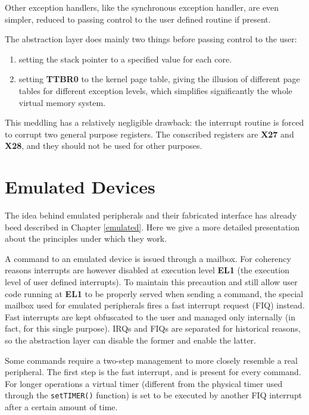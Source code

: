 \documentclass[12pt,a4paper,openright,twoside]{report}
\begin{document}
Other exception handlers, like the synchronous exception handler, are even 
simpler, reduced to passing control to the user defined routine if present.

The abstraction layer does mainly two things before passing control to the user:
\begin{enumerate}
    \item setting the stack pointer to a specified value for each core.
    \item setting \textbf{TTBR0} to the kernel page table, giving the illusion
        of different page tables for different exception levels, which simplifies
        significantly the whole virtual memory system.
\end{enumerate}
This meddling has a relatively negligible drawback: the interrupt routine is forced
to corrupt two general purpose registers.
 The conscribed registers are \textbf{X27}
and \textbf{X28}, and they should not be used for other purposes.

\section{Emulated Devices}
\label{emulateddev}
The idea behind emulated peripherals and their fabricated interface 
has already beed described in Chapter \ref{emulated}. Here we give a more detailed 
presentation about the principles under which they work.

A command to an emulated device is issued through a mailbox. For coherency reasons
interrupts are however disabled at execution level \textbf{EL1} (the execution
level of user defined interrupts). To maintain this precaution and still allow 
user code running at \textbf{EL1} to be properly served when sending a command, the
special mailbox used for emulated peripherals fires a fast interrupt request (FIQ)
instead.
Fast interrupts are kept obfuscated to the user and managed only internally (in fact,
for this single purpose). IRQs and FIQs are separated for historical reasons, so 
the abstraction layer can disable the former and enable the latter.

Some commands require a two-step management to more closely resemble a real peripheral.
The first step is the fast interrupt, and is present for every command. For longer
operations a virtual timer (different from the physical timer used through the
{\tt setTIMER()} function) is set to be executed by another FIQ interrupt after 
a certain amount of time.
\end{document}
